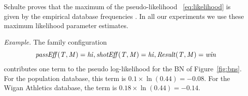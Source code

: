 \documentclass[conference]{IEEEtran}
\begin{document}

Schulte proves that the maximum of the pseudo-likelihood ~\eqref{eq:likelihood} is given by the empirical database frequencies \cite[Prop.3.1.]{Schulte2011}. In all our experiments we use these maximum likelihood parameter estimates.

{\em Example.} The family configuration \begin{displaymath} \it{passEff(T,M)=hi}, shotEff(T,M)=hi, Result(T,M)=win\end{displaymath} contributes one term to the pseudo log-likelihood for the BN of Figure~\ref{fig:bns}. For the population database, this term is $0.1 \times \ln(0.44) =-0.08 $. For the  Wigan Athletics database, the term is $0.18 \times \ln(0.44) =-0.14 $. 

\end{document}
